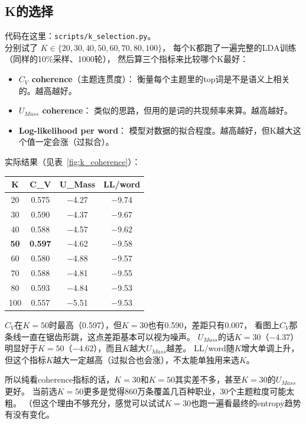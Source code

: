 \documentclass[12pt,a4paper]{ctexart}
\begin{document}
\subsection{K的选择}

代码在这里：\texttt{scripts/k\_selection.py}。
\\分别试了 $K \in \{20, 30, 40, 50, 60, 70, 80, 100\}$，
每个K都跑了一遍完整的LDA训练（同样的10\%采样、1000轮），
然后算三个指标来比较哪个K最好：

\begin{itemize}
\item \textbf{ $C_V$ coherence}（主题连贯度）：
衡量每个主题里的top词是不是语义上相关的。越高越好。
\item \textbf{$U_{Mass}$ coherence}：
类似的思路，但用的是词的共现频率来算。越高越好。
\item \textbf{Log-likelihood per word}：
模型对数据的拟合程度。越高越好，但K越大这个值一定会涨（过拟合）。
\end{itemize}

实际结果（见表~\ref{fig:k_coherence}）：

\begin{table}[h]
\centering
\small
\begin{tabular}{cccc}
\toprule
K & C\_V & U\_Mass & LL/word \\
\midrule
20 & 0.575 & $-$4.27 & $-$9.74 \\
30 & 0.590 & $-$4.37 & $-$9.67 \\
40 & 0.588 & $-$4.57 & $-$9.62 \\
\textbf{50} & \textbf{0.597} & $-$4.62 & $-$9.58 \\
60 & 0.580 & $-$4.88 & $-$9.57 \\
70 & 0.588 & $-$4.81 & $-$9.55 \\
80 & 0.593 & $-$4.84 & $-$9.53 \\
100 & 0.557 & $-$5.51 & $-$9.53 \\
\bottomrule
\end{tabular}
\end{table}

$C_V$在$K=50$时最高（0.597），但$K=30$也有0.590，差距只有0.007，
看图上$C_V$那条线一直在锯齿形跳，这点差距基本可以视为噪声。
$U_{Mass}$的话$K=30$（$-4.37$）明显好于$K=50$（$-4.62$），而且$K$越大$U_{Mass}$越差。
LL/word随$K$增大单调上升，但这个指标$K$越大一定越高（过拟合也会涨），不太能单独用来选$K$。

所以纯看coherence指标的话，$K=30$和$K=50$其实差不多，甚至$K=30$的$U_{Mass}$更好。
当前选$K=50$更多是觉得860万条覆盖几百种职业，30个主题粒度可能太粗。
（但这个理由不够充分，感觉可以试试$K=30$也跑一遍看最终的entropy趋势有没有变化。
\end{document}
